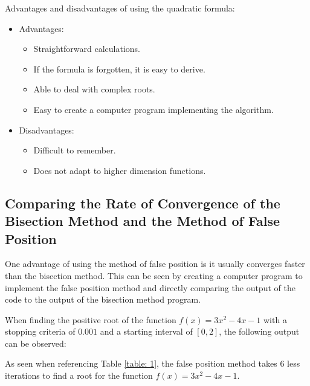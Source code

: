 \documentclass{article}
\begin{document}
\noindent Advantages and disadvantages of using the quadratic formula:
\begin{itemize}
    \item Advantages:
    \begin{itemize}
        \item Straightforward calculations.
        \item If the formula is forgotten, it is easy to derive.
        \item Able to deal with complex roots.
        \item Easy to create a computer program implementing the algorithm.
    \end{itemize}
    \item Disadvantages:
    \begin{itemize}
        \item Difficult to remember.
        \item Does not adapt to higher dimension functions.
    \end{itemize}
\end{itemize}

\subsection{Comparing the Rate of Convergence of the Bisection Method and the Method of False Position}
One advantage of using the method of false position is it usually converges faster than the bisection method. This can be seen by creating a computer program to implement the false position method and directly comparing the output of the code to the output of the bisection method program.
\par When finding the positive root of the function $f(x)=3x^2-4x-1$ with a stopping criteria of $0.001$ and a starting interval of $[0,2]$, the following output can be observed:

\begin{table}[hbt!]
\centering
{}
\caption{Using the method of false position to estimate the positive root for the function $f(x)=3x^2-4x-1$.}
\label{table: 3}
\end{table}
As seen when referencing Table \ref{table: 1}, the false position method takes 6 less iterations to find a root for the function $f(x)=3x^2-4x-1$.
\end{document}
